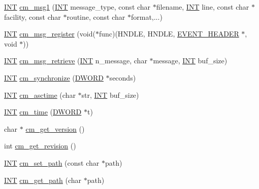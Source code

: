 \begin{DoxyCompactItemize}
\item 
\hyperlink{vppg_8h_a392e62da233ed3e2f7c3fd4f487a3896}{INT} \hyperlink{group__msgfunctionc_ga2dcad358d4ad50963cf2f34c56201f62}{cm\_\-msg1} (\hyperlink{vppg_8h_a392e62da233ed3e2f7c3fd4f487a3896}{INT} message\_\-type, const char $\ast$filename, \hyperlink{vppg_8h_a392e62da233ed3e2f7c3fd4f487a3896}{INT} line, const char $\ast$facility, const char $\ast$routine, const char $\ast$format,...)
\item 
\hyperlink{vppg_8h_a392e62da233ed3e2f7c3fd4f487a3896}{INT} \hyperlink{group__msgfunctionc_gab857885ee2ef24ddef12fb3ecf5c4c7e}{cm\_\-msg\_\-register} (void($\ast$func)(HNDLE, HNDLE, \hyperlink{structEVENT__HEADER}{EVENT\_\-HEADER} $\ast$, void $\ast$))
\item 
\hyperlink{vppg_8h_a392e62da233ed3e2f7c3fd4f487a3896}{INT} \hyperlink{group__msgfunctionc_gad92636d84ec9438a25ca6b17c4e6760d}{cm\_\-msg\_\-retrieve} (\hyperlink{vppg_8h_a392e62da233ed3e2f7c3fd4f487a3896}{INT} n\_\-message, char $\ast$message, \hyperlink{vppg_8h_a392e62da233ed3e2f7c3fd4f487a3896}{INT} buf\_\-size)
\item 
\hyperlink{vppg_8h_a392e62da233ed3e2f7c3fd4f487a3896}{INT} \hyperlink{group__cmfunctionc_ga89d09a1a52a983be86ef502614fe555c}{cm\_\-synchronize} (\hyperlink{vt2_8h_a798af1e30bc65f319c1a246cecf59e39}{DWORD} $\ast$seconds)
\item 
\hyperlink{vppg_8h_a392e62da233ed3e2f7c3fd4f487a3896}{INT} \hyperlink{group__cmfunctionc_gac340cbe250a502de8befa8c0beeac945}{cm\_\-asctime} (char $\ast$str, \hyperlink{vppg_8h_a392e62da233ed3e2f7c3fd4f487a3896}{INT} buf\_\-size)
\item 
\hyperlink{vppg_8h_a392e62da233ed3e2f7c3fd4f487a3896}{INT} \hyperlink{group__cmfunctionc_gaf53e87e278dd31007a84cf643eddba2b}{cm\_\-time} (\hyperlink{vt2_8h_a798af1e30bc65f319c1a246cecf59e39}{DWORD} $\ast$t)
\item 
char $\ast$ \hyperlink{group__cmfunctionc_ga9e7d38eff9b9d85d57fc2f4b2aacc9ab}{cm\_\-get\_\-version} ()
\item 
int \hyperlink{group__cmfunctionc_ga2bdca42b13df835e667b9258cb41c7e2}{cm\_\-get\_\-revision} ()
\item 
\hyperlink{vppg_8h_a392e62da233ed3e2f7c3fd4f487a3896}{INT} \hyperlink{group__cmfunctionc_ga006e27d46e2dd0eedde0a753f1b9ed67}{cm\_\-set\_\-path} (const char $\ast$path)
\item 
\hyperlink{vppg_8h_a392e62da233ed3e2f7c3fd4f487a3896}{INT} \hyperlink{group__cmfunctionc_gacfe11e1f0404bc4112d749eb0793671e}{cm\_\-get\_\-path} (char $\ast$path)

\end{DoxyCompactItemize}
